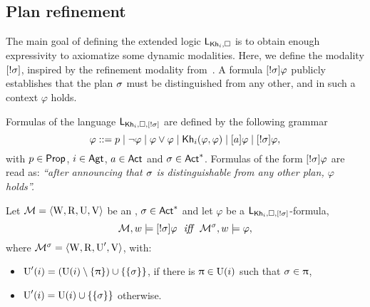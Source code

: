 \subsection{Plan refinement}
\label{sec:planref}

The main goal of defining the extended logic $\mathsf{L}_{{\sf Kh}_i,\square}$ is to obtain enough expressivity to axiomatize some dynamic modalities. Here, we define the modality $[!\sigma]$, inspired by the refinement modality from~. A formula $[!\sigma]\varphi$ publicly establishes that the plan $\sigma$ must be distinguished from any other, and in such a context $\varphi$ holds. 


\medskip 

\begin{definition}\label{def:srefsyntax}
Formulas of the language $\mathsf{L}_{{\sf Kh}_i,\square,[!\sigma]}$ are defined by the following grammar
\[
\varphi ::= p \mid \neg\varphi \mid \varphi\vee\varphi \mid {\sf Kh}_i(\varphi,\varphi) \mid [a]\varphi \mid [!\sigma]\varphi,
\]
with $p \in {\rm \sf Prop}$, $i\in{\rm \sf Agt}$, $a \in {\rm \sf Act}$ and $\sigma \in {\rm \sf Act}^*$.  Formulas of the form $[!\sigma]\varphi$ are read as: \emph{``after announcing that $\sigma$ is distinguishable from any other plan, $\varphi$ holds''.} 
\end{definition}

\medskip 

\begin{definition}\label{def:srefsemantics}
Let $\mathcal{M} = \langle \operatorname{W}, \operatorname{R}, \operatorname{U}, \operatorname{V} \rangle$ be an \ults, $\sigma \in {\rm \sf Act}^*$ and let $\varphi$ be a $\mathsf{L}_{{\sf Kh}_i,\square,[!\sigma]}$-formula,
\[
\modults,w \models \srefbox{\plan}\varphi \ \ \iff \ \ \modults^\plan,w \models \varphi,
\]
where $\mathcal{M}^\sigma = \langle \operatorname{W},\operatorname{R},\operatorname{U}',\operatorname{V} \rangle$, with:
\begin{itemize}
\item $\operatorname{U}'(i) = (\operatorname{U}(i) \setminus \{ \uppi \}) \cup \{ \{ \sigma \} \}$, if there is $\uppi \in \operatorname{U}(i)$ such that $\sigma \in \uppi$,
\item $\operatorname{U}'(i) = \operatorname{U}(i) \cup \{ \{ \sigma \} \}$ otherwise.
\end{itemize}
\end{definition}

